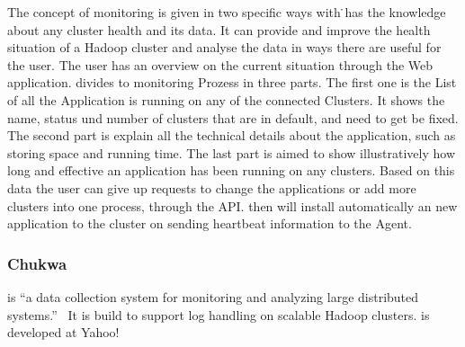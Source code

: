The concept of monitoring is given in two specific ways with \amb\. \amb has the knowledge about any cluster health and its data. It can provide and improve the health situation of a Hadoop cluster and analyse the data in ways there are useful for the user. The user has an overview on the current situation through the Web application. \amb divides to monitoring Prozess in three parts. The first one is the List of all the Application \amb is running on any of the connected Clusters. It shows the name, status und number of clusters that are in default, and need to get be fixed. The second part is explain all the technical details about the application, such as storing space and running time. The last part is aimed to show illustratively how long and effective an application has been running on any clusters. Based on this data the user can give up requests to change the applications or add more clusters into one process, through the API. \amb then will install automatically an new application to the cluster on sending heartbeat information to the \amb Agent. 

\subsubsection{Chukwa}
\chuklong is ``a data collection system for monitoring and analyzing large distributed systems.''~\cite{Boulona}
It is build to support log handling on scalable Hadoop clusters. \chuk is developed at Yahoo!~\cite{Rabkin2008a}